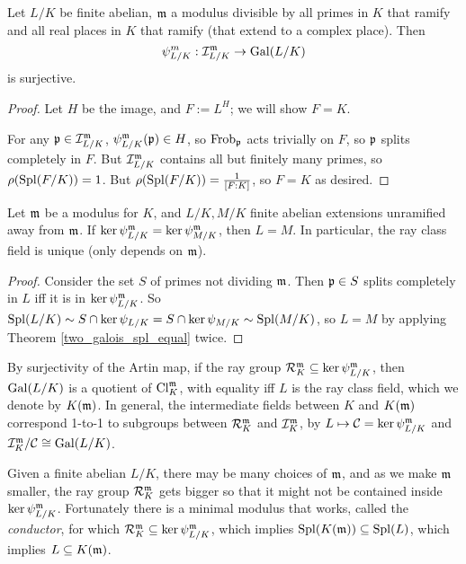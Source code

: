 \documentclass[11pt]{amsart}
\begin{document}
\begin{thm}

Let $L/K$ be finite abelian, $\mathfrak{m}$ a modulus divisible by all primes in $K$ that ramify and all real places in $K$ that ramify (that extend to a complex place). Then
\[\psi_{L/K}^m: \mathcal{I}_{L/K}^{\mathfrak{m}} \to \operatorname{Gal}(L/K)\]
is surjective.
\end{thm}

\begin{proof}
    Let $H$ be the image, and $F:= L^H$; we will show $F = K$.

    For any $\mathfrak{p}\in \mathcal{I}_{L/K}^{\mathfrak{m}}$, $\psi_{L/K}^{\mathfrak{m}}(\mathfrak{p}) \in H$, so $\operatorname{Frob}_{\mathfrak{p}}$ acts trivially on $F$, so $\mathfrak{p}$ splits completely in $F$. But $\mathcal{I}_{L/K}^{\mathfrak{m}}$ contains all but finitely many primes, so $\rho(\operatorname{Spl}(F/K)) = 1$. But $\rho(\operatorname{Spl}(F/K)) = \frac{1}{[F:K]}$, so $F=K$ as desired.
\end{proof}



\begin{thm}
    Let $\mathfrak{m}$ be a modulus for $K$, and $L/K,M/K$ finite abelian extensions unramified away from $\mathfrak{m}$. If $\ker\psi_{L/K}^{\mathfrak{m}} = \ker\psi_{M/K}^{\mathfrak{m}}$, then $L = M$. In particular, the ray class field is unique (only depends on $\mathfrak{m}$).
\end{thm}


\begin{proof}
    Consider the set $S$ of primes not dividing $\mathfrak{m}$. Then $\mathfrak{p}\in S$ splits completely in $L$ iff it is in $\ker\psi_{L/K}^{\mathfrak{m}}$. So $\operatorname{Spl}(L/K) \sim S\cap \ker\psi_{L/K} = S\cap \ker\psi_{M/K} \sim \operatorname{Spl}(M/K)$, so $L = M$ by applying Theorem \ref{two_galois_spl_equal} twice.
\end{proof}


By surjectivity of the Artin map, if the ray group $\mathcal{R}_K^{\mathfrak{m}}\subseteq \ker\psi_{L/K}^{\mathfrak{m}}$, then $\operatorname{Gal}(L/K)$ is a quotient of $\operatorname{Cl}_K^{\mathfrak{m}}$, with equality iff $L$ is the ray class field, which we denote by $K(\mathfrak{m})$. In general, the intermediate fields between $K$ and $K(\mathfrak{m})$ correspond 1-to-1 to subgroups between $\mathcal{R}_K^{\mathfrak{m}}$ and $\mathcal{I}_K^{\mathfrak{m}}$, by $L\mapsto \mathcal{C} = \ker\psi_{L/K}^{\mathfrak{m}}$ and $\mathcal{I}_K^{\mathfrak{m}}/\mathcal{C} \cong \operatorname{Gal}(L/K)$.


Given a finite abelian $L/K$, there may be many choices of $\mathfrak{m}$, and as we make $\mathfrak{m}$ smaller, the ray group $\mathcal{R}_K^{\mathfrak{m}}$ gets bigger so that it might not be contained inside $\ker\psi_{L/K}^{\mathfrak{m}}$. Fortunately there is a minimal modulus that works, called the \emph{conductor}, for which $\mathcal{R}_K^{\mathfrak{m}}\subseteq \ker\psi_{L/K}^{\mathfrak{m}}$, which implies $\operatorname{Spl}(K(\mathfrak{m})) \subseteq \operatorname{Spl}(L)$, which implies $L\subseteq K(\mathfrak{m})$.
\end{document}
